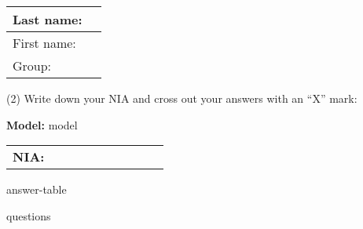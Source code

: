 \documentclass[a4paper,11pt]{article}
\begin{document}
\begin{center}
\large

\begin{tabular}{|l|p{12cm}|}
\hline
Last name:   &  \\
\hline
First name: &    \\
\hline
Group:   &  \\
\hline
\end{tabular}
\end{center}

\vspace{0.2cm}

\begin{center}
(2) Write down your NIA and cross out your answers with an ``X'' mark:
\end{center}

\begin{center}
\large
\textbf{Model:} {{model}}
\end{center}

\begin{center}
\Large
\begin{tabular}{l|p{0.3cm}|p{0.3cm}|p{0.3cm}|p{0.3cm}|p{0.3cm}|p{0.3cm}|p{0.3cm}|p{0.3cm}|p{0.3cm}|}
\cline{2-10}
\textbf{NIA:} & & & & & & & & & \\
\cline{2-10}
\end{tabular}
\end{center}

{{answer-table}}

\clearpage

{{questions}}
\end{document}
